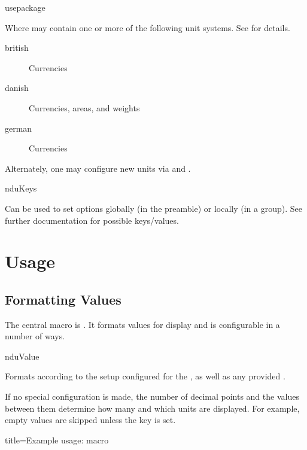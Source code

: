 \documentclass[
	a4paper,
	margin=4cm
]{article}
\begin{document}
\begin{docCommand}
	{usepackage}
	{}

Where  may contain one or more of the following unit systems. See  for details.

\begin{description}
\item[british] Currencies
\item[danish] Currencies, areas, and weights
\item[german] Currencies
\end{description}

Alternately, one may configure new units via  and .

\end{docCommand}

\begin{docCommand}
	{nduKeys}
	{}

	Can be used to set options globally (in the preamble) or locally (in a group). See further documentation for possible keys/values.

\end{docCommand}

\clearpage
\section{Usage} %

\subsection{Formatting Values} %

The central macro is . It formats values for display and is configurable in a number of ways.

\begin{docCommand}
	{nduValue}
	{}

Formats  according to the setup configured for the , as well as any provided .

If no special configuration is made, the number of decimal points and the values between them determine how many and which units are displayed. For example, empty values are skipped unless the  key is set.
	
\begin{dispExample*}{
	title=Example usage:  macro
}
\\
\\
\\
\\
\end{dispExample*}
\end{docCommand}
\end{document}
